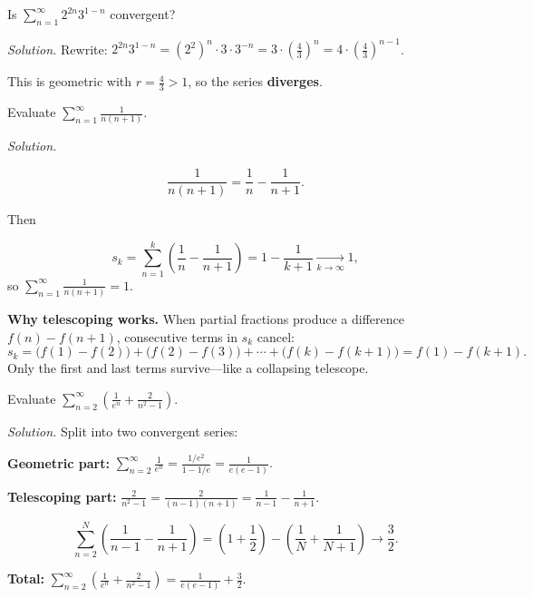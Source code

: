 \begin{examplebox}[title={Worked Example (Lecture Example 4.21): identifying divergent geometric}]

Is $\displaystyle \sum_{n=1}^{\infty}2^{2n}3^{1-n}$ convergent?

\emph{Solution.}
Rewrite: $2^{2n}3^{1-n}=(2^2)^n\cdot 3\cdot 3^{-n}=3\cdot \left(\frac{4}{3}\right)^n=4\cdot\left(\frac{4}{3}\right)^{n-1}$.

This is geometric with $r=\frac{4}{3}>1$, so the series \textbf{diverges}.

\end{examplebox}

\begin{examplebox}[title={Worked Example: telescoping via partial fractions}]

Evaluate $\displaystyle \sum_{n=1}^{\infty}\frac{1}{n(n+1)}$.

\emph{Solution.}

\[
\frac{1}{n(n+1)}=\frac{1}{n}-\frac{1}{n+1}.
\]

Then

\[
s_k=\sum_{n=1}^{k}\left(\frac{1}{n}-\frac{1}{n+1}\right)=1-\frac{1}{k+1}\xrightarrow[k\to\infty]{}1,
\]
so $\displaystyle \boxed{\sum_{n=1}^{\infty}\frac{1}{n(n+1)}=1}$.

\end{examplebox}

\noindent
\textbf{Why telescoping works.}
When partial fractions produce a difference $f(n)-f(n+1)$, consecutive terms in $s_k$ cancel:
\[
s_k = \bigl(f(1)-f(2)\bigr)+\bigl(f(2)-f(3)\bigr)+\cdots+\bigl(f(k)-f(k+1)\bigr)=f(1)-f(k+1).
\]
Only the first and last terms survive---like a collapsing telescope.

\begin{examplebox}[title={Worked Example (Tutorial 8, Q5(iv)): telescoping plus geometric}]

Evaluate $\displaystyle \sum_{n=2}^{\infty}\left(\frac{1}{e^n}+\frac{2}{n^2-1}\right)$.

\emph{Solution.}
Split into two convergent series:

\textbf{Geometric part:}
$\displaystyle\sum_{n=2}^{\infty}\frac{1}{e^n}=\frac{1/e^2}{1-1/e}=\frac{1}{e(e-1)}.$

\textbf{Telescoping part:}
$\frac{2}{n^2-1}=\frac{2}{(n-1)(n+1)}=\frac{1}{n-1}-\frac{1}{n+1}.$

\[
\sum_{n=2}^{N}\left(\frac{1}{n-1}-\frac{1}{n+1}\right)
=\left(1+\frac{1}{2}\right)-\left(\frac{1}{N}+\frac{1}{N+1}\right)\to \frac{3}{2}.
\]

\textbf{Total:}
$\displaystyle\boxed{\sum_{n=2}^{\infty}\left(\frac{1}{e^n}+\frac{2}{n^2-1}\right)=\frac{1}{e(e-1)}+\frac{3}{2}.}$

\end{examplebox}

